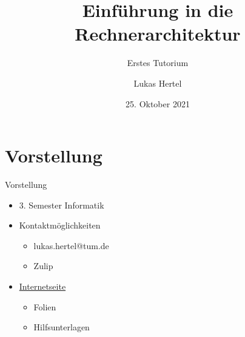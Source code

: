\documentclass[
  german,            %
  aspectratio=169,    %
  sectionpage=false,   %
]{tumbeamer}
\title{Einführung in die Rechnerarchitektur}
\subtitle{Erstes Tutorium}
\author{Lukas Hertel}
\institute{\theChairName\\\theDepartmentName\\\theUniversityName}
\date[25.10.2021]{25. Oktober 2021}
\begin{document}
\maketitle

\section{Vorstellung}
\begin{frame}{Vorstellung}
  \begin{itemize}
    \item 3. Semester Informatik
    \item Kontaktmöglichkeiten
    \begin{itemize}
        \item lukas.hertel@tum.de
        \item Zulip
    \end{itemize}
    \item \href{https://era.lukas-hertel.de}{Internetseite}
    \begin{itemize}
    	\item Folien
    	\item Hilfsunterlagen
    \end{itemize}
  \end{itemize}
\end{frame}
\end{document}
